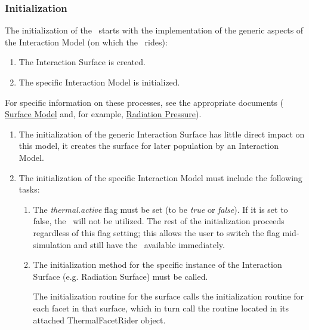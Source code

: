 
\subsubsection{Initialization}

The initialization of the \ThermalRiderDesc\ starts with the implementation of the generic aspects of the Interaction Model (on which the \ThermalRiderDesc\ rides):
\begin{enumerate}
\item The Interaction Surface is created. 
\item The specific Interaction Model is initialized.  
\end{enumerate}
For specific information on these processes, see
the appropriate documents (
  \href{file:\JEODHOME/models/utils/surface\_model/docs/surface\_model.pdf}{Surface
  Model}\cite{dynenv:SURFACEMODEL} and,
  for example,
  \href{file:\JEODHOME/models/interactions/radiation\_pressure/docs/radiation\_pressure.pdf}{Radiation
  Pressure}\cite{dynenv:RADIATIONPRESSURE}).

\begin{enumerate}
\item  The initialization of the generic Interaction Surface has
little direct impact on this model, it creates the surface for later
population by an Interaction Model.
\item  The initialization of the specific Interaction Model must include the following
tasks:
\begin{enumerate}
\item The \textit{thermal.active} flag must be set (to be \textit{true} or \textit{false}).  If
it is set to false, the \ThermalRiderDesc\ will not be utilized.  The
rest of the initialization proceeds regardless of this flag setting;
this allows the user to switch the flag mid-simulation and still have
the \ThermalRiderDesc\ available immediately.
\item The initialization method for the specific instance of the
Interaction Surface (e.g. Radiation Surface) must be called.

The initialization routine for the surface calls the initialization routine for each facet in that surface, which in turn call the 
routine located in its attached ThermalFacetRider object.  

\end{enumerate}
\end{enumerate}



